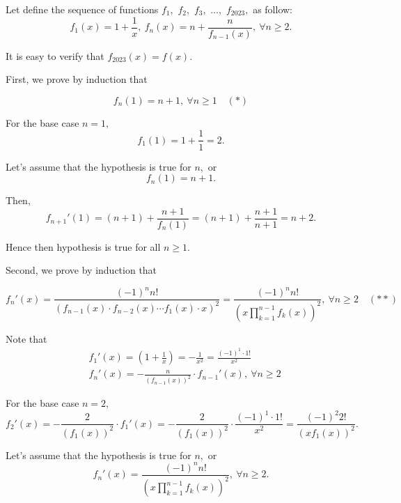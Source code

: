 \documentclass{article}
\begin{document}
\begin{soln}
    Let define the sequence of functions $f_1,$ $f_2,$ $f_3,$ $\ldots,$ $f_{2023},$ as follow:
    \[
        f_1(x) = 1 + \frac{1}{x},\ f_{n}(x) = n + \frac{n}{f_{n-1}(x)},\ \forall n \ge 2.
    \]

    It is easy to verify that $f_{2023}(x) = f(x).$

    First, we prove by induction that
    \begin{claim*}
        \[
            f_{n}(1) = n+1,\ \forall n\ge 1 \quad (*)
        \]
    \end{claim*}
    \begin{subproof}
        For the base case $n=1,$ 
        \[
            f_1(1) = 1 + \frac{1}{1} = 2.
        \]
    
        Let's assume that the hypothesis is true for $n,$ or
        \[
            f_{n}(1) = n+1.
        \]

        Then, 
        \[
            f_{n+1}'(1) = (n+1) + \frac{n+1}{f_{n}(1)} = (n+1) + \frac{n+1}{n+1} = n+2.
        \]

        Hence then hypothesis is true for all $n \ge 1.$
    \end{subproof}

\newpage

    Second, we prove by induction that
    \begin{claim*}
        \[
            f_{n}'(x) = \frac{(-1)^{n}n!}{(f_{n-1}(x) \cdot f_{n-2}(x) \cdots f_{1}(x) \cdot  x )^2} =\frac{(-1)^{n}n!}{\left(x \prod_{k=1}^{n-1} f_{k}(x) \right)^2},\ \forall n \ge 2 \quad (**)
        \]
    \end{claim*}
    \begin{subproof}
        Note that
        \[
            \begin{aligned}
                &f_{1}'(x) = \left( 1 + \frac{1}{x} \right) = -\frac{1}{x^2} = \frac{(-1)^1 \cdot 1!}{x^2}\\
                &f_{n}'(x) = -\frac{n}{(f_{n-1}(x))^2} \cdot f_{n-1}'(x),\ \forall n\ge 2
            \end{aligned}
        \]

        For the base case $n=2,$ 
        \[
            f_{2}'(x) = -\frac{2}{(f_{1}(x))^2} \cdot f_{1}'(x) = -\frac{2}{(f_{1}(x))^2} \cdot \frac{(-1)^1 \cdot 1!}{x^2} = \frac{(-1)^2 2!}{(xf_{1}(x))^2}.
        \]
    
        Let's assume that the hypothesis is true for $n,$ or
        \[
            f_{n}'(x) = \frac{(-1)^{n}n!}{(x \prod_{k=1}^{n-1} f_{k}(x))^2},\ \forall n \ge 2.
        \]


\end{subproof}
\end{soln}
\end{document}
